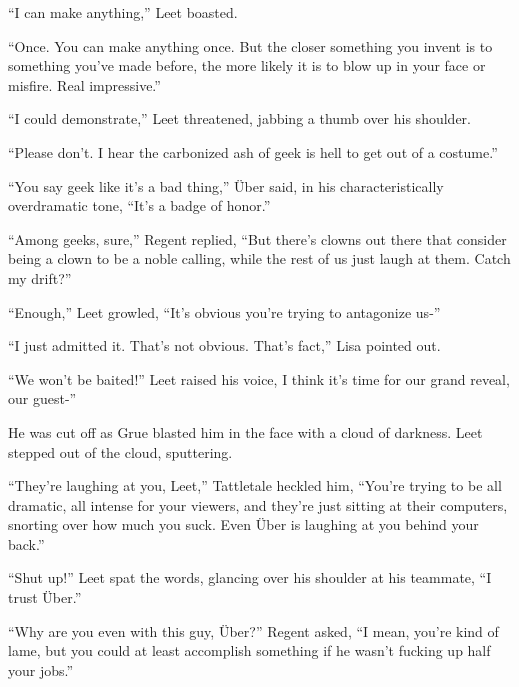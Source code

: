 ``I can make anything,'' Leet boasted.



``Once.  You can make anything once.  But the closer something you invent is to something you've made before, the more likely it is to blow up in your face or misfire.  Real impressive.''



``I could demonstrate,'' Leet threatened, jabbing a thumb over his shoulder.



``Please don't.  I hear the carbonized ash of geek is hell to get out of a costume.''



``You say geek like it's a bad thing,'' \"{U}ber said, in his characteristically overdramatic tone, ``It's a badge of honor.''



``Among geeks, sure,'' Regent replied, ``But there's clowns out there that consider being a clown to be a noble calling, while the rest of us just laugh at them.  Catch my drift?''



``Enough,'' Leet growled, ``It's obvious you're trying to antagonize us-''



``I just admitted it.  That's not obvious.  That's fact,'' Lisa pointed out.



``We won't be baited!'' Leet raised his voice, I think it's time for our grand reveal, our guest-''



He was cut off as Grue blasted him in the face with a cloud of darkness.  Leet stepped out of the cloud, sputtering.



``They're laughing at you, Leet,'' Tattletale heckled him, ``You're trying to be all dramatic, all intense for your viewers, and they're just sitting at their computers, snorting over how much you suck.  Even \"{U}ber is laughing at you behind your back.''



``Shut up!'' Leet spat the words, glancing over his shoulder at his teammate, ``I trust \"{U}ber.''



``Why are you even with this guy, \"{U}ber?'' Regent asked, ``I mean, you're kind of lame, but you could at least accomplish something if he wasn't fucking up half your jobs.''



